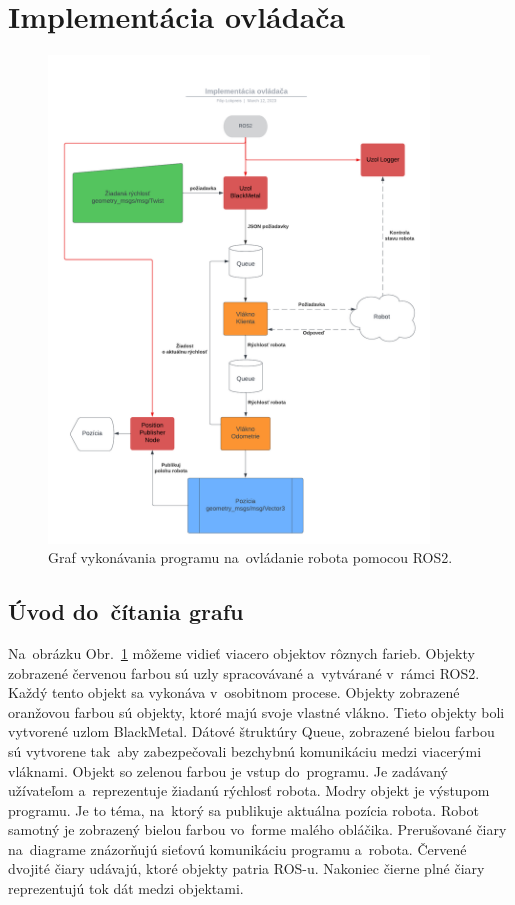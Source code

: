 \section{Implementácia ovládača}
\label{sec:program}

\begin{figure}[!htbp]
	\begin{center}
		\includegraphics[width=0.9\textwidth]{img/BlackMetal_flowchart.png}
	\end{center}
	\caption{Graf vykonávania programu na~ovládanie robota pomocou ROS2.}
	\label{fig:flowchart}
\end{figure}

\subsection{Úvod do~čítania grafu}
\label{sec:citanie_grafu}

Na~obrázku Obr.~\ref{fig:flowchart} môžeme vidieť viacero objektov rôznych farieb. Objekty zobrazené červenou farbou sú uzly spracovávané
a~vytvárané v~rámci ROS2. Každý tento objekt sa vykonáva v~osobitnom procese. Objekty zobrazené oranžovou farbou sú objekty, ktoré majú svoje
vlastné vlákno. Tieto objekty boli vytvorené uzlom BlackMetal. Dátové štruktúry Queue, zobrazené bielou farbou sú vytvorene  tak~aby
zabezpečovali bezchybnú komunikáciu medzi viacerými vláknami. Objekt so zelenou farbou je vstup do~programu. Je zadávaný užívateľom
a~reprezentuje žiadanú rýchlosť robota. Modry objekt je výstupom programu. Je to téma, na~ktorý sa publikuje aktuálna pozícia robota.
Robot samotný je zobrazený bielou farbou vo~forme malého obláčika. Prerušované čiary na~diagrame znázorňujú sieťovú komunikáciu programu
a~robota. Červené dvojité čiary udávajú, ktoré objekty patria ROS-u. Nakoniec čierne plné čiary reprezentujú tok dát medzi objektami.

